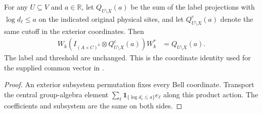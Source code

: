 \begin{theorem}
    \label{thm:schmidt_bell_witness_exterior_cutoffs}
    \leanok
    For any $U\subseteq V$ and $a\in\mathbb R$, let
    $Q_{U\setminus X}(a)$ be the sum of the label projections with
    $\log d_\ell\leq a$ on the indicated original physical sites, and
    let $Q^e_{U\setminus X}(a)$ denote the same cutoff in the exterior
    coordinates. Then
    \begin{align*}
        W_k(I_{(A\times C)^k}\otimes Q^e_{U\setminus X}(a))W_k^*
        &=Q_{U\setminus X}(a).
    \end{align*}
    The label and threshold are unchanged. This is the coordinate
    identity used for the supplied common vector in
    \cite[Section~8, lines~346--365]{OpenAI2026AreaLaw}.
\end{theorem}
\begin{proof}\leanok
    An exterior subsystem permutation fixes every Bell coordinate.
    Transport the central group-algebra element
    $\sum_\ell\mathbf1_{\{\log d_\ell\leq a\}}e_\ell$ along this product
    action. The coefficients and subsystem are the same on both sides.
\end{proof}
